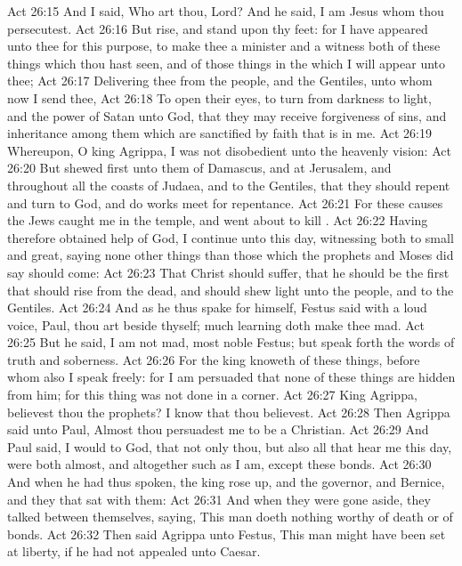 \vs Act 26:15 And I said, Who art thou, Lord? And he said, I am Jesus whom thou persecutest.
\vs Act 26:16 But rise, and stand upon thy feet: for I have appeared unto thee for this purpose, to make thee a minister and a witness both of these things which thou hast seen, and of those things in the which I will appear unto thee;
\vs Act 26:17 Delivering thee from the people, and  the Gentiles, unto whom now I send thee,
\vs Act 26:18 To open their eyes,  to turn  from darkness to light, and  the power of Satan unto God, that they may receive forgiveness of sins, and inheritance among them which are sanctified by faith that is in me.
\vs Act 26:19 Whereupon, O king Agrippa, I was not disobedient unto the heavenly vision:
\vs Act 26:20 But shewed first unto them of Damascus, and at Jerusalem, and throughout all the coasts of Judaea, and  to the Gentiles, that they should repent and turn to God, and do works meet for repentance.
\vs Act 26:21 For these causes the Jews caught me in the temple, and went about to kill .
\vs Act 26:22 Having therefore obtained help of God, I continue unto this day, witnessing both to small and great, saying none other things than those which the prophets and Moses did say should come:
\vs Act 26:23 That Christ should suffer,  that he should be the first that should rise from the dead, and should shew light unto the people, and to the Gentiles.
\vs Act 26:24 And as he thus spake for himself, Festus said with a loud voice, Paul, thou art beside thyself; much learning doth make thee mad.
\vs Act 26:25 But he said, I am not mad, most noble Festus; but speak forth the words of truth and soberness.
\vs Act 26:26 For the king knoweth of these things, before whom also I speak freely: for I am persuaded that none of these things are hidden from him; for this thing was not done in a corner.
\vs Act 26:27 King Agrippa, believest thou the prophets? I know that thou believest.
\vs Act 26:28 Then Agrippa said unto Paul, Almost thou persuadest me to be a Christian.
\vs Act 26:29 And Paul said, I would to God, that not only thou, but also all that hear me this day, were both almost, and altogether such as I am, except these bonds.
\vs Act 26:30 And when he had thus spoken, the king rose up, and the governor, and Bernice, and they that sat with them:
\vs Act 26:31 And when they were gone aside, they talked between themselves, saying, This man doeth nothing worthy of death or of bonds.
\vs Act 26:32 Then said Agrippa unto Festus, This man might have been set at liberty, if he had not appealed unto Caesar.
